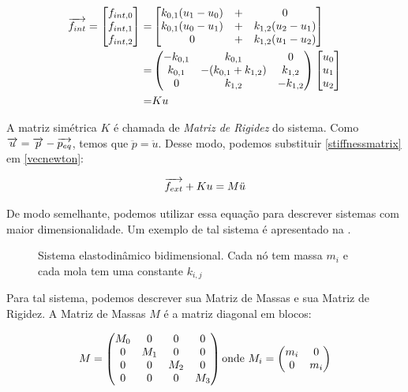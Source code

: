 \begin{eqnarray}
	\overrightarrow{f_{int}} =
	\begin{bmatrix}
		f_{int,0}\\
		f_{int,1}\\
		f_{int,2}
	\end{bmatrix}
	=&
	\begin{bmatrix}
		k_{0,1}(u_1 - u_0)&+& 0\\
		k_{0,1}(u_0 - u_1)&+& k_{1,2}(u_2 - u_1)\\
		0&+& k_{1,2}(u_1 - u_2)
	\end{bmatrix}\\
	=& 
	\begin{pmatrix}
		-k_{0,1} & k_{0,1} & 0\\
		k_{0,1} & -(k_{0,1}+k_{1,2}) & k_{1,2}\\
		0 & k_{1,2} & -k_{1,2}
	\end{pmatrix}
	\begin{bmatrix}
		u_0\\
		u_1\\
		u_2
	\end{bmatrix}\\
	=& Ku \label{stiffnessmatrix}
\end{eqnarray}

A matriz simétrica $K$ é chamada de \emph{Matriz de Rigidez} do sistema. Como $\overrightarrow{u} = \overrightarrow{p} - \overrightarrow{p_{eq}}$, temos que $\ddot{p} = \ddot{u}$. Desse modo, podemos substituir \eqref{stiffnessmatrix} em \eqref{vecnewton}:

\begin{equation}
	\overrightarrow{f_{ext}} + Ku = M\ddot{u}
\end{equation}

De modo semelhante, podemos utilizar essa equação para descrever sistemas com maior dimensionalidade. Um exemplo de tal sistema é apresentado na .

\begin{figure}[ht]
	\centering
	
	\caption[Sistema elastodinâmico bidimensional]{Sistema elastodinâmico bidimensional. Cada nó tem massa $m_i$ e cada mola tem uma constante $k_{i,j}$}\label{2dbodysystem}
\end{figure}

Para tal sistema, podemos descrever sua Matriz de Massas e sua Matriz de Rigidez. A Matriz de Massas $M$ é a matriz diagonal em blocos:

\begin{equation}
	M = \begin{pmatrix}
		M_0 & 0 & 0 & 0\\
		0 & M_1 & 0 & 0\\
		0 & 0 & M_2 & 0\\
		0 & 0 & 0 & M_3 
	\end{pmatrix}\\
	\text{onde }
	M_i = \begin{pmatrix}
		m_i & 0\\
		0 & m_i
	\end{pmatrix}
\end{equation}

